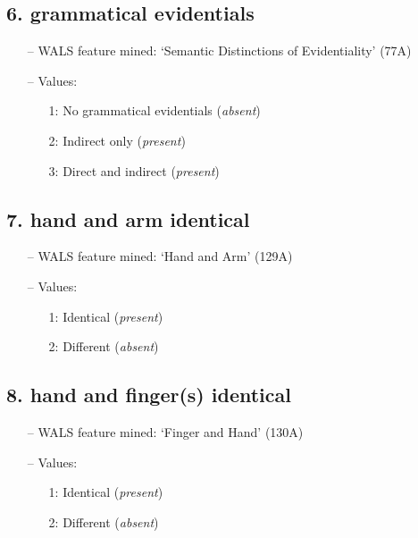 \subsection*{6. grammatical evidentials}

\begin{itemize}
\item[--] WALS feature mined: `Semantic Distinctions of Evidentiality' (77A)
\item[--] Values:

\begin{enumerate}
\item[1:] No grammatical evidentials (\emph{absent})
\item[2:] Indirect only (\emph{present})
\item[3:] Direct and indirect (\emph{present})
\end{enumerate}
\end{itemize}

\subsection*{7. hand and arm identical}

\begin{itemize}
\item[--] WALS feature mined: `Hand and Arm' (129A)
\item[--] Values:

\begin{enumerate}
\item[1:] Identical (\emph{present})
\item[2:] Different (\emph{absent})
\end{enumerate}
\end{itemize}

\subsection*{8. hand and finger(s) identical}

\begin{itemize}
\item[--] WALS feature mined: `Finger and Hand' (130A)
\item[--] Values:

\begin{enumerate}
\item[1:] Identical (\emph{present})
\item[2:] Different (\emph{absent})
\end{enumerate}
\end{itemize}

